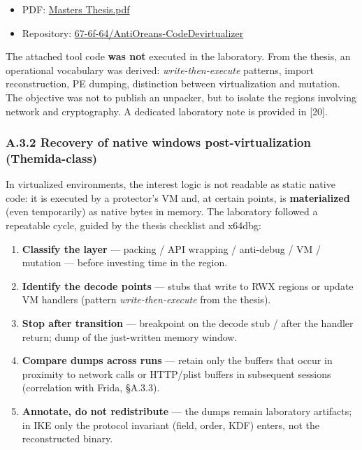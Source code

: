 \documentclass[
  english,
  10pt]{article}
\providecommand{\tightlist}{%
  \setlength{\itemsep}{0pt}\setlength{\parskip}{0pt}}
\begin{document}
\begin{itemize}
\tightlist
\item
  PDF:
  \href{https://github.com/67-6f-64/AntiOreans-CodeDevirtualizer/blob/main/Masters\%20Thesis.pdf}{Masters
  Thesis.pdf}
\item
  Repository:
  \href{https://github.com/67-6f-64/AntiOreans-CodeDevirtualizer}{67-6f-64/AntiOreans-CodeDevirtualizer}
\end{itemize}

The attached tool code \textbf{was not} executed in the laboratory. From
the thesis, an operational vocabulary was derived:
\emph{write-then-execute} patterns, import reconstruction, PE dumping,
distinction between virtualization and mutation. The objective was not
to publish an unpacker, but to isolate the regions involving network and
cryptography. A dedicated laboratory note is provided in {[}20{]}.

\subsubsection{A.3.2 Recovery of native windows post-virtualization
(Themida-class)}\label{a.3.2-recovery-of-native-windows-post-virtualization-themida-class}

In virtualized environments, the interest logic is not readable as
static native code: it is executed by a protector's VM and, at certain
points, is \textbf{materialized} (even temporarily) as native bytes in
memory. The laboratory followed a repeatable cycle, guided by the thesis
checklist and x64dbg:

\begin{enumerate}
\def\labelenumi{\arabic{enumi}.}
\tightlist
\item
  \textbf{Classify the layer} --- packing / API wrapping / anti-debug /
  VM / mutation --- before investing time in the region.
\item
  \textbf{Identify the decode points} --- stubs that write to RWX
  regions or update VM handlers (pattern \emph{write-then-execute} from
  the thesis).
\item
  \textbf{Stop after transition} --- breakpoint on the decode stub /
  after the handler return; dump of the just-written memory window.
\item
  \textbf{Compare dumps across runs} --- retain only the buffers that
  occur in proximity to network calls or HTTP/plist buffers in
  subsequent sessions (correlation with Frida, §A.3.3).
\item
  \textbf{Annotate, do not redistribute} --- the dumps remain laboratory
  artifacts; in IKE only the protocol invariant (field, order, KDF)
  enters, not the reconstructed binary.
\end{enumerate}
\end{document}
